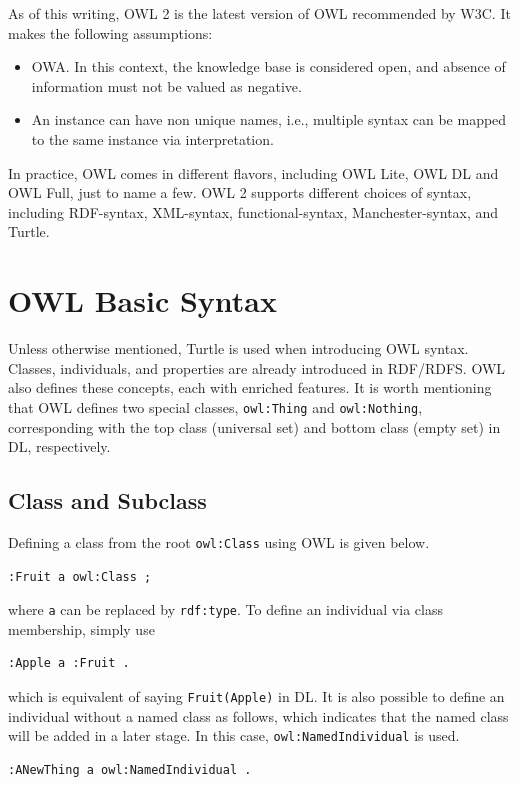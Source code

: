 As of this writing, OWL 2 is the latest version of OWL recommended by W3C. It makes the following assumptions:
\begin{itemize}
	\item OWA. In this context, the knowledge base is considered open, and absence of information must not be valued as negative.
	\item An instance can have non unique names, i.e., multiple syntax can be mapped to the same instance via interpretation.
\end{itemize}

In practice, OWL comes in different flavors, including OWL Lite, OWL DL and OWL Full, just to name a few. OWL 2 supports different choices of syntax, including RDF-syntax, XML-syntax, functional-syntax, Manchester-syntax, and Turtle.

\section{OWL Basic Syntax}

Unless otherwise mentioned, Turtle is used when introducing OWL syntax. Classes, individuals, and properties are already introduced in RDF/RDFS. OWL also defines these concepts, each with enriched features. It is worth mentioning that OWL defines two special classes, \verb|owl:Thing| and \verb|owl:Nothing|, corresponding with the top class (universal set) and bottom class (empty set) in DL, respectively.

\subsection{Class and Subclass}

Defining a class from the root \verb|owl:Class| using OWL is given below.
\begin{lstlisting}
:Fruit a owl:Class ;
\end{lstlisting}
where \verb|a| can be replaced by \verb|rdf:type|. To define an individual via class membership, simply use
\begin{lstlisting}
:Apple a :Fruit .
\end{lstlisting}
which is equivalent of saying \verb|Fruit(Apple)| in DL. It is also possible to define an individual without a named class as follows, which indicates that the named class will be added in a later stage. In this case, \verb|owl:NamedIndividual| is used.
\begin{lstlisting}
:ANewThing a owl:NamedIndividual .
\end{lstlisting}


